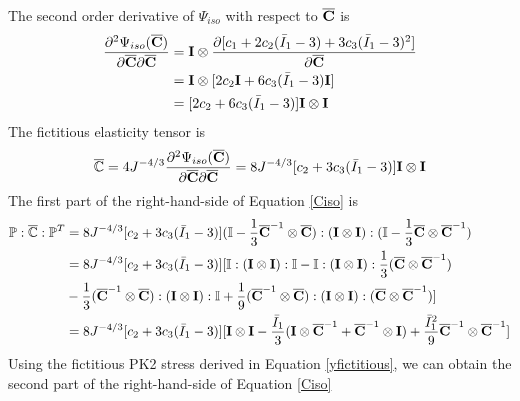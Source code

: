 %
The second order derivative of $\Psi_{iso}$ with respect to $\overline{\bold{C}}$ is
\begin{equation}
\begin{split}
\frac{\partial^2\Psi_{iso}(\overline{\bold{C}})}{\partial\overline{\bold{C}}\partial\overline{\bold{C}}} &= 
\bold{I} \otimes \frac{\partial[c_1 + 2c_2({\bar{I}}_1-3) + 3c_3({\bar{I}}_1-3)^2 ]}{\partial{\overline{\bold{C}}}} \\
&= \bold{I} \otimes [2c_2\bold{I} + 6c_3({\bar{I}}_1-3)\bold{I}]\\
&= [2c_2 + 6c_3({\bar{I}}_1-3)] \bold{I} \otimes \bold{I}
\end{split}
\end{equation}
The fictitious elasticity tensor is
\begin{equation}
\overline{\mathbb{C}} = 4J^{-4/3}\frac{\partial^2\Psi_{iso}(\overline{\bold{C}})}{\partial{\overline{\bold{C}}}{\partial{\overline{\bold{C}}}}} = 8J^{-4/3}[c_2 + 3c_3({\bar{I}}_1 - 3) ]\bold{I} \otimes \bold{I}
\end{equation}
The first part of the right-hand-side of Equation \ref{Ciso} is
\begin{equation} \label{ypart1}
\begin{split}
\mathbb{P} : \overline{\mathbb{C}} : {\mathbb{P}}^T &= 8J^{-4/3}[c_2 + 3c_3({\bar{I}}_1 - 3 )](\mathbb{I} - \frac{1}{3}{\overline{\bold{C}}}^{-1} \otimes {\overline{\bold{C}}}) : (\bold{I} \otimes \bold{I}): (\mathbb{I} - \frac{1}{3}{\overline{\bold{C}}} \otimes {\overline{\bold{C}}}^{-1}) \\
&= 8J^{-4/3}[c_2 + 3c_3({\bar{I}}_1 - 3 )][\mathbb{I}:(\bold{I} \otimes \bold{I}):\mathbb{I} - \mathbb{I}:(\bold{I} \otimes \bold{I}): \frac{1}{3} ({\overline{\bold{C}}} \otimes {\overline{\bold{C}}}^{-1}) \\
&- \frac{1}{3} ({\overline{\bold{C}}}^{-1} \otimes {\overline{\bold{C}}}) : (\bold{I} \otimes \bold{I}) : \mathbb{I} +  \frac{1}{9} ({\overline{\bold{C}}}^{-1} \otimes {\overline{\bold{C}}}) : (\bold{I} \otimes \bold{I}) : ({\overline{\bold{C}}} \otimes {\overline{\bold{C}}}^{-1}) ] \\
&= 8J^{-4/3}[c_2 + 3c_3({\bar{I}}_1 - 3 )] [\bold{I} \otimes \bold{I} - \frac{{\bar{I}}_1}{3}(\bold{I} \otimes {\overline{\bold{C}}}^{-1} +{\overline{\bold{C}}}^{-1}  \otimes  \bold{I}) + \frac{{{\bar{I}}_1}^2}{9} {\overline{\bold{C}}}^{-1} \otimes {\overline{\bold{C}}}^{-1} ]
\end{split}
\end{equation}
Using the fictitious PK2 stress derived in Equation \ref{yfictitious}, we can obtain the second part of the right-hand-side of Equation \ref{Ciso}
